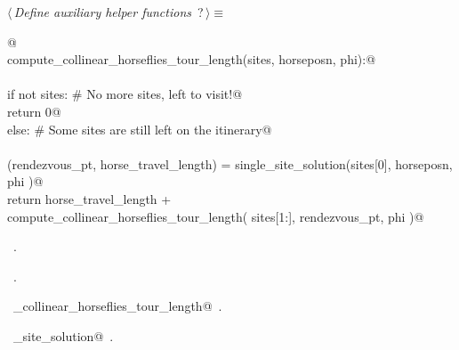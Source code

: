 \documentclass[11.5pt]{report}
\begin{document}
\begin{center}
\end{center}

\begin{flushleft} \small\label{scrap32}\raggedright\small
{} $\langle\,${\itshape Define auxiliary helper functions}\nobreak\ {\footnotesize {?}}$\,\rangle\equiv$
\vspace{-1ex}
\begin{list}{}{} \item
\mbox{}\verb@   @\\
\mbox{}\verb@def compute_collinear_horseflies_tour_length(sites, horseposn, phi):@\\
\mbox{}\verb@@\\
\mbox{}\verb@     if not sites: # No more sites, left to visit!@\\
\mbox{}\verb@          return 0@\\
\mbox{}\verb@     else:         # Some sites are still left on the itinerary@\\
\mbox{}\verb@@\\
\mbox{}\verb@          (rendezvous_pt, horse_travel_length) = single_site_solution(sites[0], horseposn, phi )@\\
\mbox{}\verb@          return horse_travel_length  + \@\\
\mbox{}\verb@                 compute_collinear_horseflies_tour_length( sites[1:], rendezvous_pt, phi )@\\
\mbox{}\verb@@{\NWsep}
\end{list}
\vspace{-1.5ex}
\footnotesize
\begin{list}{}{\setlength{\itemsep}{-\parsep}\setlength{\itemindent}{-\leftmargin}}
\item \NWtxtMacroDefBy\ .
\item \NWtxtMacroRefIn\ .
\item \NWtxtIdentsDefed\nobreak\  \verb@compute_collinear_horseflies_tour_length@\nobreak\ .\item \NWtxtIdentsUsed\nobreak\  \verb@single_site_solution@\nobreak\ .
\item{}
\end{list}
\vspace{4ex}
\end{flushleft}
\end{document}
